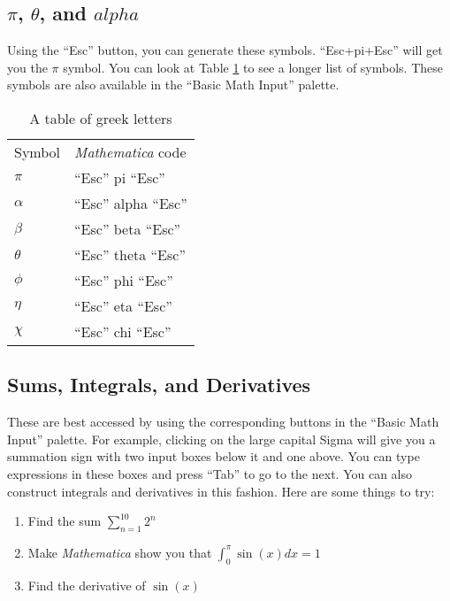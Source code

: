 \subsection{$\pi$, $\theta$, and $alpha$}

Using the ``Esc'' button, you can generate these symbols. ``Esc+pi+Esc'' will get you the $\pi$ symbol. You can look at Table \ref{tab:GreekLettersTable} to see a longer list of symbols. These symbols are also available in the ``Basic Math Input'' palette.

\begin{table}
	   \centering
	   \begin{tabular}{ll}
			 Symbol & \emph{Mathematica} code \\
			 $\pi$ & ``Esc'' pi ``Esc'' \\
			 $\alpha$ & ``Esc'' alpha ``Esc'' \\
			 $\beta$ & ``Esc'' beta ``Esc'' \\
			 $\theta$ & ``Esc'' theta ``Esc'' \\
			 $\phi$ & ``Esc'' phi ``Esc'' \\
			 $\eta$ & ``Esc'' eta ``Esc'' \\
			 $\chi$ & ``Esc'' chi ``Esc'' \\
	   \end{tabular}
	   \caption{A table of greek letters}
	   \label{tab:GreekLettersTable}
\end{table}

\subsection{Sums, Integrals, and Derivatives}

These are best accessed by using the corresponding buttons in the ``Basic Math Input'' palette. For example, clicking on the large capital Sigma will give you a summation sign with two input boxes below it and one above. You can type expressions in these boxes and press ``Tab'' to go to the next. You can also construct integrals and derivatives in this fashion. Here are some things to try:

\begin{enumerate}
	   \item Find the sum $\sum_{n=1}^{10} 2^n$
	   \item Make \emph{Mathematica} show you that $\int_0^{\pi} \sin(x) dx = 1$
	   \item Find the derivative of $\sin(x)$
\end{enumerate}

